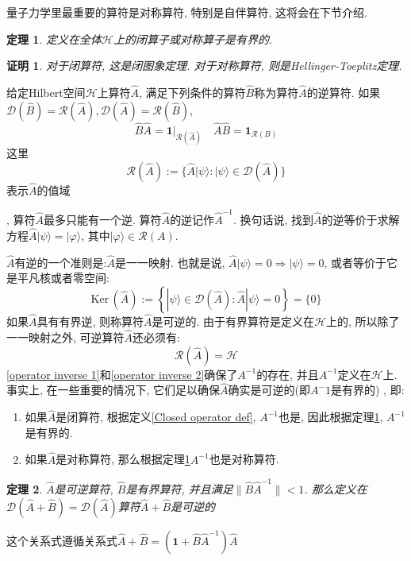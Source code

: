 \documentclass[a4paper,11pt]{article}
\theoremstyle{mystyle}
\newtheorem{theorem}{\hspace{2em}定理}[section]
\newtheorem{Proof}{\hspace{2em}证明}[section]
\begin{document}
量子力学里最重要的算符是对称算符, 特别是自伴算符, 这将会在下节介绍.
\begin{theorem}\label{Bounded operator theorem}
  定义在全体$\mathcal{H}$上的闭算子或对称算子是有界的.
\end{theorem}
\begin{Proof}
  对于闭算符, 这是闭图象定理. 对于对称算符, 则是Hellinger-Toeplitz定理.
\end{Proof}
\begin{definition}[逆算符]
  给定Hilbert空间$\mathcal{H}$上算符$\hat{A}$, 满足下列条件的算符$\hat{B}$称为算符$\hat{A}$的逆算符. 如果$\mathcal{D}(\hat{B})=\mathcal{R}(\hat{A}), \mathcal{D}(\hat{A})=\mathcal{R}(\hat{B})$,
\begin{equation*}
  \hat{B}\hat{A}=\mathbf{1}|_{\mathcal{R}(\hat{A})}\quad\hat{A}\hat{B}=\mathbf{1}_{\mathcal{R}(B)}
\end{equation*}
这里
\begin{equation*}
  \mathcal{R}(\hat{A}):=\{\hat{A}|\psi\rangle:|\psi\rangle\in \mathcal{D}(\hat{A})\}
\end{equation*}
表示$\hat{A}$的值域
\end{definition}
, 算符$\hat{A}$最多只能有一个逆. 算符$\hat{A}$的逆记作$\hat{A}^{-1}$. 换句话说, 找到$\hat{A}$的逆等价于求解方程$\hat{A}|\psi\rangle=|\varphi\rangle$, 其中$|\varphi\rangle\in\mathcal{R}(A)$.

$\hat{A}$有逆的一个准则是:$\hat{A}$是一一映射. 也就是说, $\hat{A}|\psi\rangle=0\Longrightarrow|\psi\rangle=0$, 或者等价于它是平凡核或者零空间:
\begin{equation}\label{operator inverse 1}
  \mathrm{Ker}\,(\hat{A}):=\left\{|\psi\rangle\in\mathcal{D}(\hat{A}):\hat{A}|\psi\rangle=0\right\}=\{0\}
\end{equation}
如果$\hat{A}$具有有界逆, 则称算符$\hat{A}$是可逆的. 由于有界算符是定义在$\mathcal{H}$上的, 所以除了一一映射之外, 可逆算符$\hat{A}$还必须有:
\begin{equation}\label{operator inverse 2}
  \mathcal{R}(\hat{A})=\mathcal{H}
\end{equation}
\ref{operator inverse 1}和\ref{operator inverse 2}确保了$A^{-1}$的存在, 并且$A^{-1}$定义在$\mathcal{H}$上. 事实上, 在一些重要的情况下, 它们足以确保$\hat{A}$确实是可逆的(即$A^-1$是有界的) , 即:
\begin{enumerate}
  \item 如果$\hat{A}$是闭算符, 根据定义\ref{Closed operator def}, $A^{-1}$也是, 因此根据定理\ref{Bounded operator theorem}, $A^{-1}$是有界的.
  \item 如果$\hat{A}$是对称算符, 那么根据定理\ref{Bounded operator theorem}$A^{-1}$也是对称算符.
\end{enumerate}
\begin{theorem}\label{A+B inverse}
  $\hat{A}$是可逆算符, $\hat{B}$是有界算符, 并且满足$\|\hat{B}\hat{A}^{-1}\|<1$. 那么定义在$\mathcal{D}(\hat{A}+\hat{B})=\mathcal{D}(\hat{A})$算符$\hat{A}+\hat{B}$是可逆的
\end{theorem}
这个关系式遵循关系式$\hat{A}+\hat{B}=(\mathbf{1}+\hat{B}\hat{A}^{-1})\hat{A}$
\end{document}

